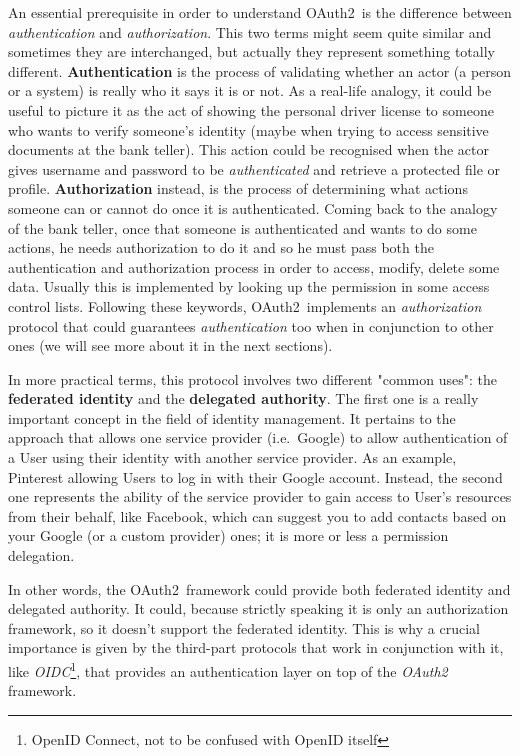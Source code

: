 \documentclass[a4paper,12pt]{article}
\def\ie{i.e.\xspace}
\def\oauth{OAuth2\xspace}
\begin{document}
An essential prerequisite in order to understand \oauth\ is the difference between \textit{authentication} and \textit{authorization}. This two terms might seem quite similar and sometimes they are interchanged, but actually they represent something totally different.
\textbf{Authentication} is the process of validating whether an actor (a person or a system) is really who it says it is or not.
As a real-life analogy, it could be useful to picture it as the act of showing the personal driver license to someone who wants to verify someone's identity (maybe when trying to access sensitive documents at the bank teller). 
This action could be recognised when the actor gives username and password to be \textit{authenticated} and retrieve a protected file or profile. 
\textbf{Authorization} instead, is the process of determining what actions someone can or cannot do once it is authenticated.
Coming back to the analogy of the bank teller, once that someone is authenticated and wants to do some actions, he needs authorization to do it and so he must pass both the authentication and authorization process in order to access, modify, delete some data. Usually this is implemented by looking up the permission in some access control lists.
Following these keywords, \oauth\ implements an \textit{authorization} protocol that could guarantees \textit{authentication} too when in conjunction to other ones (we will see more about it in the next sections).

In more practical terms, this protocol involves two different "common uses": the \textbf{federated identity} and the \textbf{delegated authority}.
The first one is a really important concept in the field of identity management. It pertains to the approach that allows one service provider (\ie\ Google) to allow authentication of a User using their identity with another service provider. As an example, Pinterest allowing Users to log in with their Google account.
Instead, the second one represents the ability of the service provider to gain access to User's resources from their behalf, like Facebook, which can suggest you to add contacts based on your Google (or a custom provider) ones; it is more or less a permission delegation.

In other words, the \oauth\ framework could provide both federated identity and delegated authority. It could, because strictly speaking it is only an authorization framework, so it doesn't support the federated identity. This is why a crucial importance is given by the third-part protocols that work in conjunction with it, like \textit{OIDC}\footnote{OpenID Connect, not to be confused with OpenID itself}, that provides an authentication layer on top of the \textit{\oauth} framework.
\end{document}
